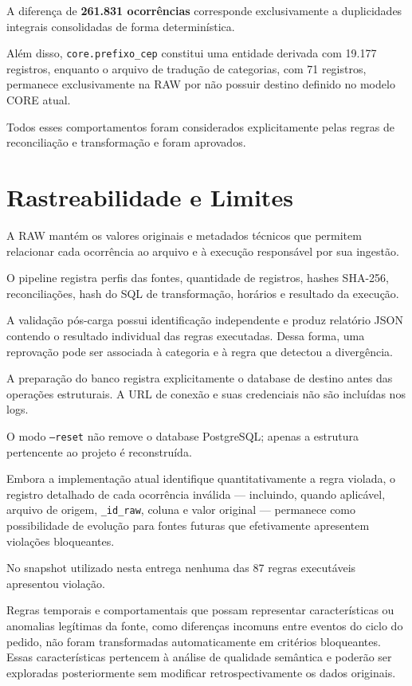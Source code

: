 \documentclass[12pt,a4paper]{article}
\begin{document}
	A diferença de \textbf{261.831 ocorrências} corresponde exclusivamente a
	duplicidades integrais consolidadas de forma determinística.
	
	Além disso, \texttt{core.prefixo\_cep} constitui uma entidade derivada com
	19.177 registros, enquanto o arquivo de tradução de categorias, com 71
	registros, permanece exclusivamente na RAW por não possuir destino definido no
	modelo CORE atual.
	
	Todos esses comportamentos foram considerados explicitamente pelas regras de
	reconciliação e transformação e foram aprovados.
	
	\section{Rastreabilidade e Limites}
	
	A RAW mantém os valores originais e metadados técnicos que permitem relacionar
	cada ocorrência ao arquivo e à execução responsável por sua ingestão.
	
	O pipeline registra perfis das fontes, quantidade de registros, hashes SHA-256,
	reconciliações, hash do SQL de transformação, horários e resultado da execução.
	
	A validação pós-carga possui identificação independente e produz relatório JSON
	contendo o resultado individual das regras executadas. Dessa forma, uma
	reprovação pode ser associada à categoria e à regra que detectou a divergência.
	
	A preparação do banco registra explicitamente o database de destino antes das
	operações estruturais. A URL de conexão e suas credenciais não são incluídas
	nos logs.
	
	O modo \texttt{--reset} não remove o database PostgreSQL; apenas a estrutura
	pertencente ao projeto é reconstruída.
	
	Embora a implementação atual identifique quantitativamente a regra violada, o
	registro detalhado de cada ocorrência inválida --- incluindo, quando aplicável,
	arquivo de origem, \texttt{\_id\_raw}, coluna e valor original --- permanece
	como possibilidade de evolução para fontes futuras que efetivamente apresentem
	violações bloqueantes.
	
	No snapshot utilizado nesta entrega nenhuma das 87 regras executáveis
	apresentou violação.
	
	Regras temporais e comportamentais que possam representar características ou
	anomalias legítimas da fonte, como diferenças incomuns entre eventos do ciclo
	do pedido, não foram transformadas automaticamente em critérios bloqueantes.
	Essas características pertencem à análise de qualidade semântica e poderão ser
	exploradas posteriormente sem modificar retrospectivamente os dados originais.
	
\end{document}

